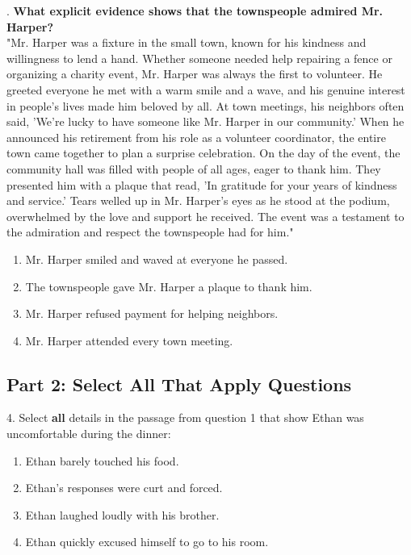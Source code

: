 \documentclass[12pt]{article}
\begin{document}
\vspace{1cm}
. \textbf{What explicit evidence shows that the townspeople admired Mr. Harper?\\}
"Mr. Harper was a fixture in the small town, known for his kindness and willingness to lend a hand. Whether someone needed help repairing a fence or organizing a charity event, Mr. Harper was always the first to volunteer. He greeted everyone he met with a warm smile and a wave, and his genuine interest in people’s lives made him beloved by all. At town meetings, his neighbors often said, 'We’re lucky to have someone like Mr. Harper in our community.' When he announced his retirement from his role as a volunteer coordinator, the entire town came together to plan a surprise celebration. On the day of the event, the community hall was filled with people of all ages, eager to thank him. They presented him with a plaque that read, 'In gratitude for your years of kindness and service.' Tears welled up in Mr. Harper’s eyes as he stood at the podium, overwhelmed by the love and support he received. The event was a testament to the admiration and respect the townspeople had for him."  
\begin{enumerate}[label=\Alph*.]
    \item Mr. Harper smiled and waved at everyone he passed.  
    \item The townspeople gave Mr. Harper a plaque to thank him.  
    \item Mr. Harper refused payment for helping neighbors.  
    \item Mr. Harper attended every town meeting.  
\end{enumerate}


\subsection*{Part 2: Select All That Apply Questions}

4. Select \textbf{all} details in the passage from question 1 that show Ethan was uncomfortable during the dinner:  
\begin{enumerate}[label=\Alph*.]
    \item Ethan barely touched his food.  
    \item Ethan’s responses were curt and forced.  
    \item Ethan laughed loudly with his brother.  
    \item Ethan quickly excused himself to go to his room.  
\end{enumerate}
\end{document}
